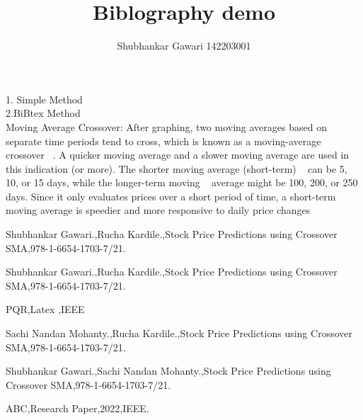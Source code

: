 \documentclass[11pt,a4paper]{report}
\author{Shubhankar Gawari 142203001}
\title{Biblography demo}
\begin{document}
\maketitle

1. Simple Method\\
2.BiBtex Method\\

Moving Average Crossover: After graphing, two 
moving averages based on separate time periods tend to cross, 
which is known as a moving-average crossover ~\cite{abc}. A quicker 
moving average and a slower moving average are used in this 
indication (or more). The shorter moving average (short-term) ~\cite{pqr}
can be 5, 10, or 15 days, while the longer-term moving ~\cite{aa,trishna}
average might be 100, 200, or 250 days. Since it only 
evaluates prices over a short period of time, a short-term 
moving average is speedier and more responsive to daily 
price changes ~\cite{trishna,sachi,rucha}


\begin{thebibliography} {}

Shubhankar Gawari.,Rucha Kardile.,Stock Price Predictions using Crossover SMA,978-1-6654-1703-7/21.

 Shubhankar Gawari.,Rucha Kardile.,Stock Price Predictions using Crossover SMA,978-1-6654-1703-7/21.

 PQR,Latex ,IEEE

 Sachi Nandan Mohanty.,Rucha Kardile.,Stock Price Predictions using Crossover SMA,978-1-6654-1703-7/21.

 Shubhankar Gawari.,Sachi Nandan Mohanty.,Stock Price Predictions using Crossover SMA,978-1-6654-1703-7/21.

 ABC,Research Paper,2022,IEEE.



\end{thebibliography} 
\end{document}
